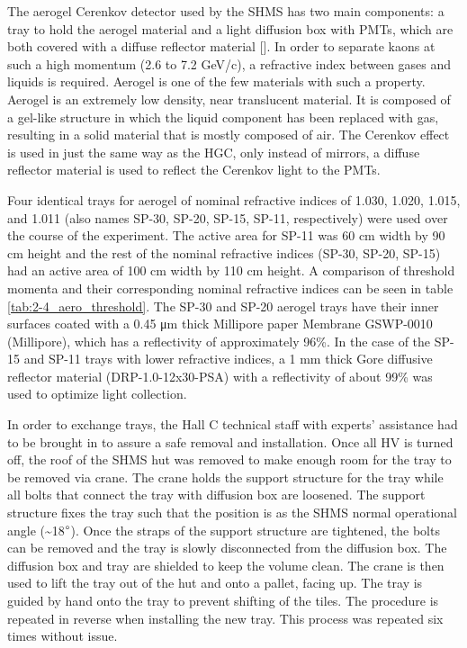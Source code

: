 \documentclass[
]{report}
\begin{document}


The aerogel Cerenkov detector used by the SHMS has two main components:
a tray to hold the aerogel material and a light diffusion box with PMTs,
which are both covered with a diffuse reflector material
{[}\cite{horn_aerogel_2017}{]}. In order to separate kaons at such a
high momentum (2.6 to 7.2 GeV/c), a refractive index between gases and
liquids is required. Aerogel is one of the few materials with such a
property. Aerogel is an extremely low density, near translucent
material. It is composed of a gel-like structure in which the liquid
component has been replaced with gas, resulting in a solid material that
is mostly composed of air. The Cerenkov effect is used in just the same
way as the HGC, only instead of mirrors, a diffuse reflector material is
used to reflect the Cerenkov light to the PMTs.



Four identical trays for aerogel of nominal refractive indices of 1.030,
1.020, 1.015, and 1.011 (also names SP-30, SP-20, SP-15, SP-11,
respectively) were used over the course of the experiment. The active
area for SP-11 was 60 cm width by 90 cm height and the rest of the
nominal refractive indices (SP-30, SP-20, SP-15) had an active area of
100 cm width by 110 cm height. A comparison of threshold momenta and
their corresponding nominal refractive indices can be seen in table
\ref{tab:2-4_aero_threshold}. The SP-30 and SP-20 aerogel trays have
their inner surfaces coated with a 0.45 μm thick Millipore paper
Membrane GSWP-0010 (Millipore), which has a reflectivity of
approximately 96\%. In the case of the SP-15 and SP-11 trays with lower
refractive indices, a 1 mm thick Gore diffusive reflector material
(DRP-1.0-12x30-PSA) with a reflectivity of about 99\% was used to
optimize light collection.



In order to exchange trays, the Hall C technical staff with experts'
assistance had to be brought in to assure a safe removal and
installation. Once all HV is turned off, the roof of the SHMS hut was
removed to make enough room for the tray to be removed via crane. The
crane holds the support structure for the tray while all bolts that
connect the tray with diffusion box are loosened. The support structure
fixes the tray such that the position is as the SHMS normal operational
angle (\textasciitilde18\(\degree\)). Once the straps of the support
structure are tightened, the bolts can be removed and the tray is slowly
disconnected from the diffusion box. The diffusion box and tray are
shielded to keep the volume clean. The crane is then used to lift the
tray out of the hut and onto a pallet, facing up. The tray is guided by
hand onto the tray to prevent shifting of the tiles. The procedure is
repeated in reverse when installing the new tray. This process was
repeated six times without issue.
\end{document}

